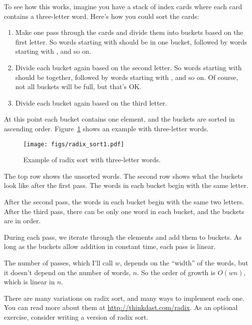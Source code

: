 \documentclass[12pt]{book}
\theoremstyle{exercise}
\begin{document}
To see how this works, imagine you have a stack of index cards where
each card contains a three-letter word. Here's how you could sort the
cards:

\begin{enumerate}

\item
  Make one pass through the cards and divide them into buckets based on
  the first letter. So words starting with  should be
  in one bucket, followed by words starting with , and so on.

\item
  Divide each bucket again based on the second letter. So words starting
  with  should be together, followed by words starting with
  , and so on. Of course, not all buckets will be full, but
  that's OK.

\item
  Divide each bucket again based on the third letter.

\end{enumerate}

At this point each bucket contains one element, and the buckets are
sorted in ascending order. Figure~\ref{fig-sort3}
shows an example with
three-letter words.

\begin{figure}
\centering
\texttt{[image: figs/radix\_sort1.pdf]}
\caption{Example of radix sort with three-letter words.}
\label{fig-sort3}
\end{figure}

The top row shows the unsorted words. The second row shows what the
buckets look like after the first pass. The words in each bucket begin
with the same letter.

After the second pass, the words in each bucket begin with the same two
letters. After the third pass, there can be only one word in each
bucket, and the buckets are in order.

During each pass, we iterate through the elements and add them to
buckets. As long as the buckets allow addition in constant time, each
pass is linear.


The number of passes, which I'll call $w$, depends on the ``width''
of the words, but it doesn't depend on the number of words, $n$.
So the order of growth is $O(wn)$, which is linear in $n$.

There are many variations on radix sort, and many ways to implement
each one. You can read more about them at
\url{http://thinkdast.com/radix}. As an optional
exercise, consider writing a version of radix sort.
\end{document}
